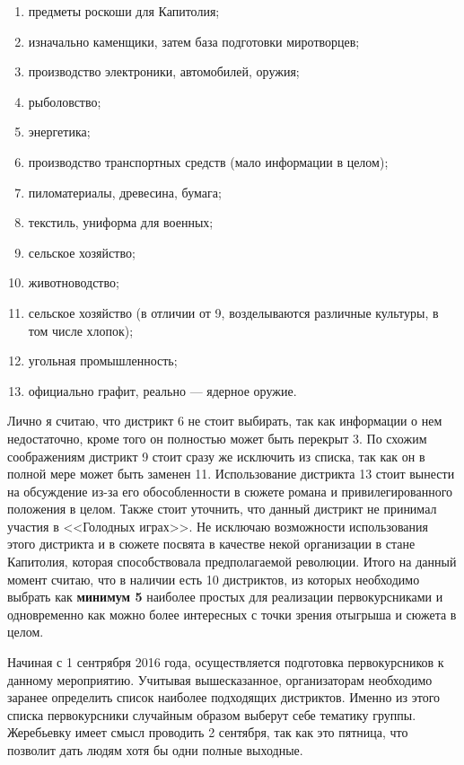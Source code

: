 \documentclass[a4paper, 12pt]{extarticle}
\begin{document}
\begin{enumerate}
\item предметы роскоши для Капитолия;
\item изначально каменщики, затем база подготовки миротворцев;
\item производство электроники, автомобилей, оружия;
\item рыболовство;
\item энергетика;
\item производство транспортных средств (мало информации в целом);
\item пиломатериалы, древесина, бумага;
\item текстиль, униформа для военных;
\item сельское хозяйство;
\item животноводство;
\item сельское хозяйство (в отличии от 9, возделываются различные культуры, в том числе хлопок);
\item угольная промышленность;
\item официально графит, реально --- ядерное оружие.
\end{enumerate}

\par Лично я считаю, что дистрикт 6 не стоит выбирать, так как информации о нем недостаточно, кроме того он полностью может быть перекрыт 3. По схожим соображениям дистрикт 9 стоит сразу же исключить из списка, так как он в полной мере может быть заменен 11. Использование дистрикта 13 стоит вынести на обсуждение из-за его обособленности в сюжете романа и привилегированного положения в целом. Также стоит уточнить, что данный дистрикт не принимал участия в <<Голодных играх>>. Не исключаю возможности использования этого дистрикта и в сюжете посвята в качестве некой организации в стане Капитолия, которая способствовала предполагаемой революции. Итого на данный момент считаю, что в наличии есть 10 дистриктов, из которых необходимо выбрать как \textbf{минимум 5} наиболее простых для реализации первокурсниками и одновременно как можно более интересных с точки зрения отыгрыша и сюжета в целом.

\par Начиная с 1 сентрября 2016 года, осуществляется подготовка первокурсников к данному мероприятию. Учитывая вышесказанное, организаторам необходимо заранее определить список наиболее подходящих дистриктов. Именно из этого списка первокурсники случайным образом выберут себе тематику группы. Жеребьевку имеет смысл проводить 2 сентября, так как это пятница, что позволит дать людям хотя бы одни полные выходные.
\end{document}
